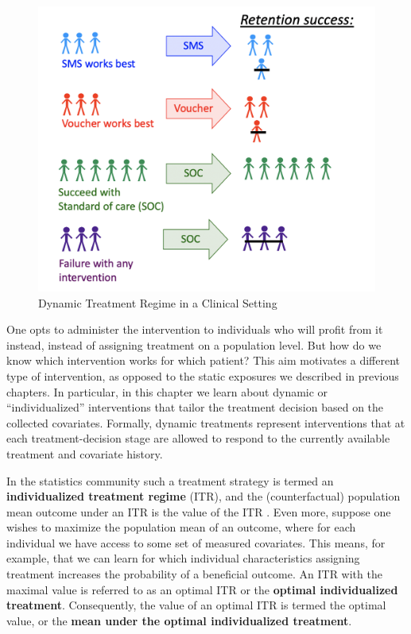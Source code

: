 \documentclass[12pt, krantz2,]{krantz}
\theoremstyle{definition}
\theoremstyle{definition}
\theoremstyle{definition}
\newcommand{\1}{\mathbbm{1}}
\begin{document}
\begin{figure}

{\centering \includegraphics[width=0.8\linewidth]{img/image/DynamicA_Illustration} 

}

\caption{Dynamic Treatment Regime in a Clinical Setting}\label{fig:unnamed-chunk-1}
\end{figure}

One opts to administer the intervention to individuals who will profit from it instead,
instead of assigning treatment on a population level. But how do we know which
intervention works for which patient? This aim motivates a different type of
intervention, as opposed to the static exposures we described in previous chapters. In
particular, in this chapter we learn about dynamic or ``individualized''
interventions that tailor the treatment decision based on the collected
covariates. Formally, dynamic treatments represent interventions that at each
treatment-decision stage are allowed to respond to the currently available
treatment and covariate history.

In the statistics community such a treatment strategy is termed an
\textbf{individualized treatment regime} (ITR), and the (counterfactual) population
mean outcome under an ITR is the value of the ITR \citep{neyman1990, robins1986, pearl2009}. Even more, suppose one wishes to maximize the population mean of an
outcome, where for each individual we have access to some set of measured
covariates. This means, for example, that we can learn for which individual
characteristics assigning treatment increases the probability of a beneficial
outcome. An ITR with the maximal value is referred to as an
optimal ITR or the \textbf{optimal individualized treatment}. Consequently, the value
of an optimal ITR is termed the optimal value, or the \textbf{mean under the optimal
individualized treatment}.
\end{document}
